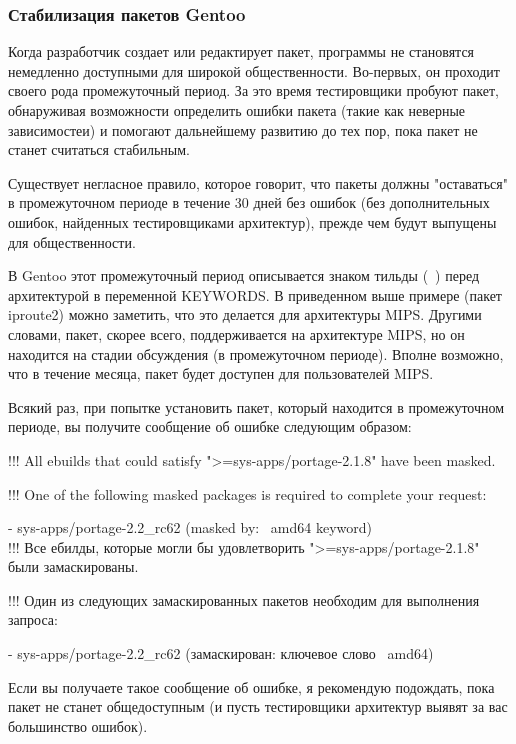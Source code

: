 \documentclass[10pt]{book}
\begin{document}
\subsubsection{Стабилизация пакетов Gentoo}
Когда разработчик создает или редактирует пакет, программы не становятся немедленно доступными для широкой общественности. Во-первых, он проходит своего рода промежуточный период. За это время тестировщики пробуют
пакет, обнаруживая возможности определить ошибки пакета (такие как неверные зависимостеи) и помогают дальнейшему развитию до тех пор, пока пакет не станет считаться стабильным.

Существует негласное правило, которое говорит, что пакеты должны "оставаться" в промежуточном периоде в течение 30 дней без ошибок (без дополнительных ошибок, найденных тестировщиками архитектур), прежде чем будут выпущены для общественности.

В Gentoo этот промежуточный период описывается знаком тильды (~) перед архитектурой в переменной KEYWORDS. В приведенном выше примере (пакет iproute2) можно заметить, что это делается для архитектуры MIPS. Другими словами, пакет, скорее всего, поддерживается на архитектуре MIPS, но он находится на стадии обсуждения (в промежуточном периоде). Вполне возможно, что в течение месяца, пакет будет доступен для пользователей MIPS.

Всякий раз, при попытке установить пакет, который находится в промежуточном периоде, вы получите сообщение об ошибке следующим образом:

\begin{tcolorbox}
!!! All ebuilds that could satisfy ">=sys-apps/portage-2.1.8" have been masked.

!!! One of the following masked packages is required to complete your request:

- sys-apps/portage-2.2\_rc62 (masked by: ~amd64 keyword) \\


!!! Все ебилды, которые могли бы удовлетворить ">=sys-apps/portage-2.1.8" были замаскированы.

!!! Один из следующих замаскированных пакетов необходим для выполнения запроса:

- sys-apps/portage-2.2\_rc62 (замаскирован: ключевое слово ~amd64)
\end{tcolorbox}

Если вы получаете такое сообщение об ошибке, я рекомендую подождать, пока пакет не станет общедоступным (и пусть тестировщики архитектур выявят за вас большинство ошибок).
\end{document}
